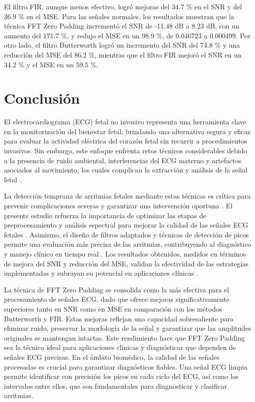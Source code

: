\documentclass[10pt, conference]{IEEEtran}
\begin{document}
El filtro FIR, aunque menos efectivo, logró mejoras del 34.7 \% en el SNR y del 36.9 \% en el MSE. Para las señales normales, los resultados muestran que la técnica FFT Zero Padding incrementó el SNR de -11.48 dB a 8.23 dB, con un aumento del 171.7 \%, y redujo el MSE en un 98.9 \%, de 0.046723 a 0.000499. Por otro lado, el filtro Butterworth logró un incremento del SNR del 74.8 \% y una reducción del MSE del 86.2 \%, mientras que el filtro FIR mejoró el SNR en un 34.2 \% y el MSE en un 59.5 \%.

\section{Conclusión}

El electrocardiograma (ECG) fetal no invasivo representa una herramienta clave en la monitorización del bienestar fetal, brindando una alternativa segura y eficaz para evaluar la actividad eléctrica del corazón fetal sin recurrir a procedimientos invasivos. Sin embargo, este enfoque enfrenta retos técnicos considerables debido a la presencia de ruido ambiental, interferencias del ECG materno y artefactos asociados al movimiento, los cuales complican la extracción y análisis de la señal fetal \cite{addison2005wavelet}. 

La detección temprana de arritmias fetales mediante estas técnicas es crítica para prevenir complicaciones severas y garantizar una intervención oportuna \cite{kotas2007detection}. El presente estudio refuerza la importancia de optimizar las etapas de preprocesamiento y análisis espectral para mejorar la calidad de las señales ECG fetales \cite{taylor2003fetal}. Asimismo, el diseño de filtros adaptados y técnicas de detección de picos permite una evaluación más precisa de las arritmias, contribuyendo al diagnóstico y manejo clínico en tiempo real \cite{xu2004rpeak}. Los resultados obtenidos, medidos en términos de mejora del SNR y reducción del MSE, validan la efectividad de las estrategias implementadas y subrayan su potencial en aplicaciones clínicas \cite{clifford2013physionet}. 

La técnica de FFT Zero Padding se consolida como la más efectiva para el procesamiento de señales ECG, dado que ofrece mejoras significativamente superiores tanto en SNR como en MSE en comparación con los métodos Butterworth y FIR. Estas mejoras reflejan una capacidad sobresaliente para eliminar ruido, preservar la morfología de la señal y garantizar que las amplitudes originales se mantengan intactas. Este rendimiento hace que FFT Zero Padding sea la técnica ideal para aplicaciones clínicas y diagnósticas que dependen de señales ECG precisas. En el ámbito biomédico, la calidad de las señales procesadas es crucial para garantizar diagnósticos fiables. Una señal ECG limpia permite identificar con precisión los picos en cada ciclo del ECG, así como los intervalos entre ellos, que son fundamentales para diagnosticar y clasificar arritmias. 
\end{document}
